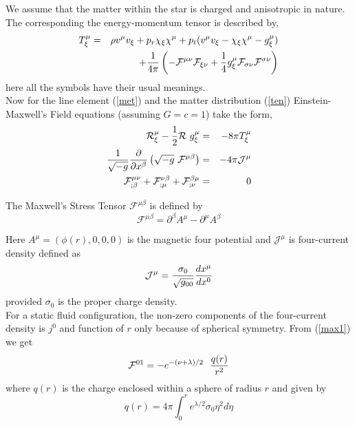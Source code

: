 \documentclass[preprintnumbers,amsmath,amssymb,floatfix,9pt,prd,twocolumn,
superscriptaddress,nofootinbib]{revtex4}
\begin{document}
We assume that the matter within the star is charged and anisotropic in nature. The corresponding the energy-momentum tensor is described by,
\begin{eqnarray}
T^\mu_\xi &=& \rho v^\mu v_\xi + p_r \chi_\xi \chi^\mu + p_t(v^\mu v_\xi -\chi_\xi \chi^\mu-g^\mu_\xi) \nonumber\\
&&+{1\over 4\pi}\left(-\mathcal{F}^{\mu \nu} \mathcal{F}_{\xi \nu}+{1\over 4}g^\mu_\xi \mathcal{F}_{\sigma \nu} \mathcal{F}^{\sigma \nu}\right)\label{ten}
\end{eqnarray}
here all the symbols have their usual meanings.\\

Now for the line element (\ref{met}) and the matter distribution (\ref{ten}) Einstein-Maxwell's Field equations (assuming $G=c=1$) take the form,
\begin{eqnarray}
\mathcal{R}^\mu_\xi-{1\over 2}\mathcal{R}~g^\mu_\xi &=& -8\pi T^\mu_\xi \label{ein}\\
{1\over \sqrt{-g}}{\partial \over \partial x^\beta}\left(\sqrt{-g}~\mathcal{F}^{\mu \beta}\right) &=& -4\pi \mathcal{J}^\mu \label{max1}\\
\mathcal{F}^{\mu \nu}_{;\beta}+\mathcal{F}^{\nu \beta}_{;\mu}+\mathcal{F}^{\beta \mu}_{;\nu} &=& 0 \label{max2}
\end{eqnarray}

The Maxwell's Stress Tensor $\mathcal{F}^{\mu \beta}$ is defined by
\begin{equation}
\mathcal{F}^{\mu \beta}=\partial^\beta A^\mu -\partial^\mu A^\beta
\end{equation}

Here $A^\mu=(\phi(r),0,0,0)$ is the magnetic four potential and $\mathcal{J}^\mu$ is four-current density defined as
\begin{equation}
\mathcal{J}^\mu={\sigma_0 \over \sqrt{g_{00}}}{dx^\mu \over dx^0}
\end{equation}
provided $\sigma_0$ is the proper charge density.\\

For a static fluid configuration, the non-zero components of the four-current density is $j^0$ and function of $r$ only because of spherical symmetry. From (\ref{max1}) we get
\begin{equation}
\mathcal{F}^{01}=-e^{-(\nu+\lambda)/ 2} ~~{q(r) \over r^2}
\end{equation}
where $q(r)$ is the charge enclosed within a sphere of radius $r$ and given by
\begin{equation}
q(r)=4\pi \int_0^r e^{\lambda/2}\sigma_0 \eta^2 d\eta
\end{equation}
\end{document}
